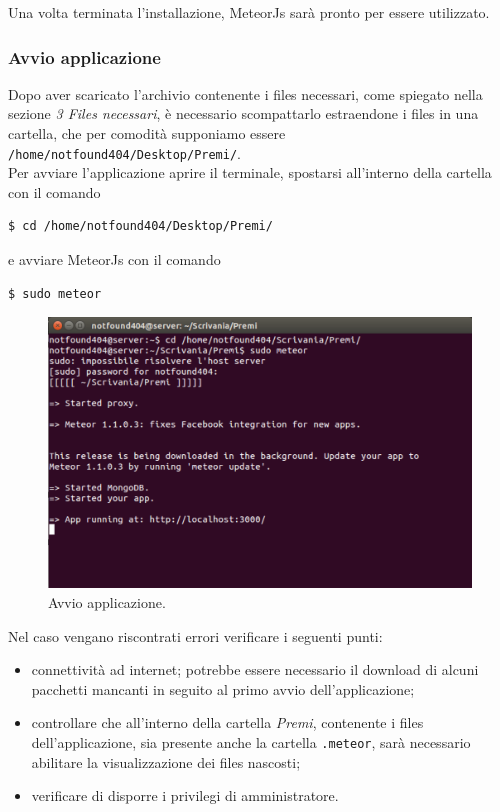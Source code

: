 Una volta terminata l'installazione, MeteorJs sarà pronto per essere utilizzato.

\subsubsection{Avvio applicazione}
Dopo aver scaricato l'archivio contenente i files necessari, come spiegato nella sezione \emph{3 Files necessari}, è necessario scompattarlo estraendone i files in una cartella, che per comodità supponiamo essere \verb+/home/notfound404/Desktop/Premi/+.\\
Per avviare l'applicazione aprire il terminale, spostarsi all'interno della cartella con il comando

\begin{lstlisting}[style=DOS]
	$ cd /home/notfound404/Desktop/Premi/
\end{lstlisting}

e avviare MeteorJs con il comando 

\begin{lstlisting}[style=DOS]
	$ sudo meteor
\end{lstlisting}

\begin{figure}[!h]
\begin{center}
\includegraphics[scale=0.4]{img/start_premi.png}
\caption{Avvio applicazione.}
\end{center}
\end{figure}

\newpage
Nel caso vengano riscontrati errori verificare i seguenti punti:
\begin{itemize}
\item connettività ad internet; potrebbe essere necessario il download di alcuni pacchetti mancanti in seguito al primo avvio dell'applicazione;
\item controllare che all'interno della cartella \emph{Premi}, contenente i files dell'applicazione, sia presente anche la cartella \verb+.meteor+, sarà necessario abilitare la visualizzazione dei files nascosti;
\item verificare di disporre i privilegi di amministratore.
\end{itemize}

